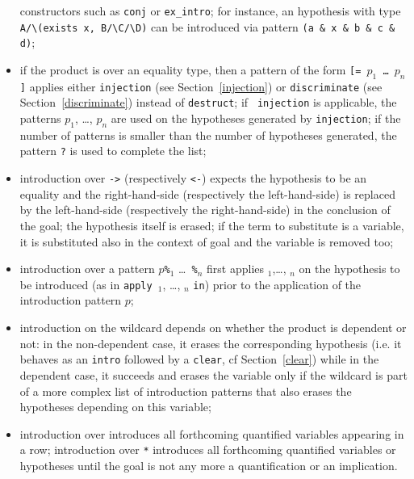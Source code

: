 \begin{itemize}
  constructors such as {\tt conj} or {\tt ex\_intro}; for instance, an
  hypothesis with type {\tt A\verb|/\|(exists x, B\verb|/\|C\verb|/\|D)} can be
  introduced via pattern {\tt (a \& x \& b \& c \& d)};
\item if the product is over an equality type, then a pattern of the
  form {\tt [= $p_{1}$ \dots\ $p_n$]} applies either {\tt injection}
  (see Section~\ref{injection}) or {\tt discriminate} (see
  Section~\ref{discriminate}) instead of {\tt destruct}; if {\tt
    injection} is applicable, the patterns $p_1$, \ldots, $p_n$ are
  used on the hypotheses generated by {\tt injection}; if the number
  of patterns is smaller than the number of hypotheses generated, the
  pattern \texttt{?} is used to complete the list;
\item introduction over {\tt ->} (respectively {\tt <-}) expects the
  hypothesis to be an equality and the right-hand-side (respectively
  the left-hand-side) is replaced by the left-hand-side (respectively
  the right-hand-side) in the conclusion of the goal; the hypothesis
  itself is erased; if the term to substitute is a variable, it is
  substituted also in the context of goal and the variable is removed
  too;
\item introduction over a pattern $p${\tt \%{\term$_1$}} \ldots {\tt
  \%{\term$_n$}} first applies {\term$_1$},\ldots, {\term$_n$} on the
  hypothesis to be introduced (as in {\tt apply }{\term}$_1$, \ldots,
  {\term}$_n$ {\tt in}) prior to the application of the introduction
  pattern $p$;
\item introduction on the wildcard depends on whether the product is
  dependent or not: in the non-dependent case, it erases the
  corresponding hypothesis (i.e. it behaves as an {\tt intro} followed
  by a {\tt clear}, cf Section~\ref{clear}) while in the dependent
  case, it succeeds and erases the variable only if the wildcard is
  part of a more complex list of introduction patterns that also
  erases the hypotheses depending on this variable;
\item introduction over {\tt *} introduces all forthcoming quantified
  variables appearing in a row; introduction over {\tt **} introduces
  all forthcoming quantified variables or hypotheses until the goal is
  not any more a quantification or an implication.
\end{itemize}

\Example

